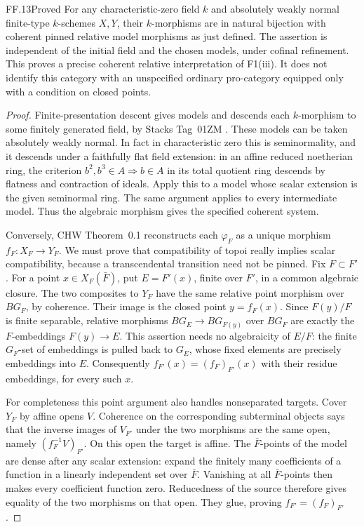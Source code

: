 \begin{claim}{FF.13}{Proved}\label{clm:FFpro}
For any characteristic-zero field \(k\) and absolutely weakly
normal finite-type \(k\)-schemes \(X,Y\), their \(k\)-morphisms
are in natural bijection with coherent pinned relative model
morphisms as just defined. The assertion is independent of the
initial field and the chosen models, under cofinal refinement.
This proves a precise coherent relative interpretation of F1(iii).
It does not identify this category with an unspecified ordinary
pro-category equipped only with a condition on closed points.
\end{claim}
\begin{proof}
Finite-presentation descent gives models and descends each
\(k\)-morphism to some finitely generated field, by Stacks
Tag~01ZM \citep{FF_StacksLimits}. These models can be taken
absolutely weakly normal. In fact in characteristic zero this is
seminormality, and it descends under a faithfully flat field
extension: in an affine reduced noetherian ring, the criterion
\(b^2,b^3\in A\Rightarrow b\in A\) in its total quotient
ring descends by flatness and contraction of ideals. Apply this
to a model whose scalar extension is the given seminormal ring.
The same argument applies to every intermediate model. Thus the
algebraic morphism gives the specified coherent system.

Conversely, CHW Theorem~0.1 reconstructs each \(\varphi_F\) as
a unique morphism \(f_F:X_F\to Y_F\). We must prove that
compatibility of topoi really implies scalar compatibility,
because a transcendental transition need not be pinned.
Fix \(F\subset F'\). For a point \(x\in X_F(\bar F)\),
put \(E=F'(x)\), finite over \(F'\), in a common algebraic
closure. The two composites to \(Y_F\) have the same relative
point morphism over \(BG_F\), by coherence. Their image is the
closed point \(y=f_F(x)\). Since \(F(y)/F\) is finite
separable, relative morphisms \(BG_E\to BG_{F(y)}\) over
\(BG_F\) are exactly the \(F\)-embeddings \(F(y)\to E\).
This assertion needs no algebraicity of \(E/F\): the finite
\(G_F\)-set of embeddings is pulled back to \(G_E\), whose
fixed elements are precisely embeddings into \(E\).
Consequently \(f_{F'}(x)=(f_F)_{F'}(x)\) with their residue
embeddings, for every such \(x\).

For completeness this point argument also handles nonseparated
targets. Cover \(Y_F\) by affine opens \(V\). Coherence on
the corresponding subterminal objects says that the inverse
images of \(V_{F'}\) under the two morphisms are the same
open, namely \((f_F^{-1}V)_{F'}\). On this open the target
is affine. The \(\bar F\)-points of the model are dense after
any scalar extension: expand the finitely many coefficients of
a function in a linearly independent set over \(\bar F\).
Vanishing at all \(\bar F\)-points then makes every coefficient
function zero. Reducedness of the source therefore gives equality
of the two morphisms on that open. They glue, proving
\(f_{F'}=(f_F)_{F'}\).


\end{proof}
